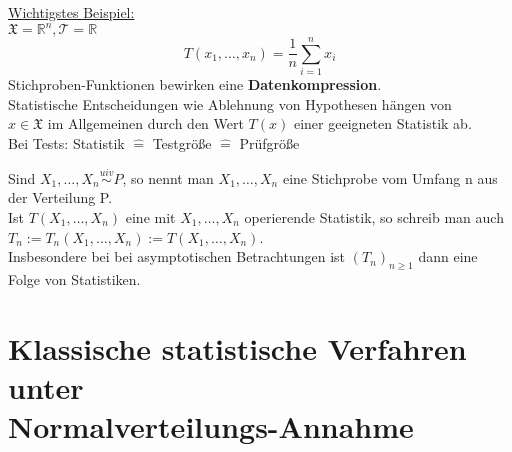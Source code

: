 \documentclass[a4paper,11pt,twoside,titlepage]{article}
\newcommand{\R}{{\mathbb R}}
\newcommand{\XX}{{\mathfrak X}} %
\newcommand\TT{ \mathcal{T} }
\begin{document}
\underline{Wichtigstes Beispiel:}\\
$\XX=\R^n,\TT=\R$ 
$$T(x_1,\ldots,x_n)= \frac{1}{n}\sum_{i=1}^n x_i$$
Stichproben-Funktionen bewirken eine \textbf{Datenkompression}.\\
Statistische Entscheidungen wie Ablehnung von Hypothesen hängen von\\ $x\in\XX$ im Allgemeinen durch den Wert $T(x)$ einer geeigneten Statistik ab.\\
Bei Tests: Statistik $\hat{=}$ Testgröße $\hat=$ Prüfgröße

Sind $X_1,\ldots,X_n\stackrel{uiv}{\sim}P$, so nennt man $X_1,\ldots,X_n$ eine Stichprobe vom Umfang n aus der Verteilung P.\\
Ist $T(X_1,\ldots,X_n)$ eine mit $X_1,\ldots,X_n$ operierende Statistik, so schreib man auch $T_n:=T_n(X_1,\ldots,X_n):=T(X_1,\ldots,X_n)$.
\\
Insbesondere bei bei asymptotischen Betrachtungen ist $(T_n)_{n\geq1}$ dann eine Folge von Statistiken.

\cleardoublepage
\section{Klassische statistische Verfahren unter\\ Normalverteilungs-Annahme}
\end{document}
